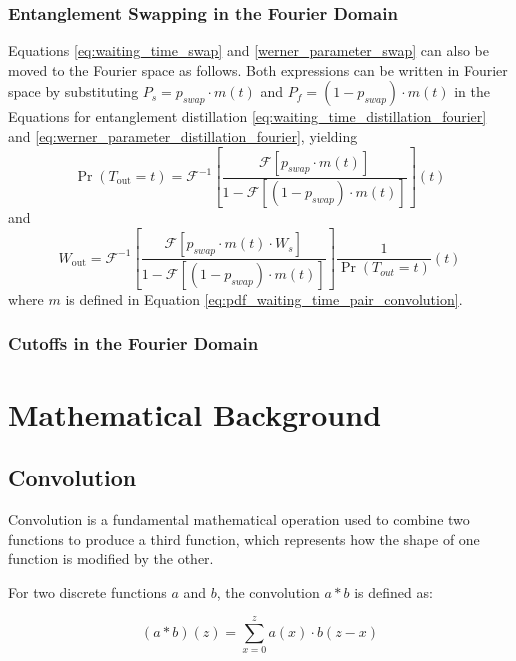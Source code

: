\documentclass{masterthesis}
\begin{document}
\subsection*{Entanglement Swapping in the Fourier Domain}

Equations \ref{eq:waiting_time_swap} and \ref{werner_parameter_swap} can also be moved to the Fourier space as follows.
Both expressions can be written in Fourier space by substituting $P_s = p_{swap} \cdot m(t)$ and $P_f = (1 - p_{swap}) \cdot m(t)$ in the Equations for entanglement distillation \ref{eq:waiting_time_distillation_fourier} and \ref{eq:werner_parameter_distillation_fourier}, yielding
\begin{equation}
    \Pr(T_{\text{out}} = t) = \mathcal{F}^{-1} \left[ \frac{\mathcal{F}[p_{swap} \cdot m(t)]}{1 - \mathcal{F}[(1 - p_{swap}) \cdot m(t)]} \right](t)
\end{equation}
and
\begin{equation}
    W_{\text{out}} = \mathcal{F}^{-1} \left[ \frac{\mathcal{F}[p_{swap} \cdot m(t) \cdot W_s]}{1 - \mathcal{F}[(1 - p_{swap}) \cdot m(t)]} \right] \frac{1}{\Pr(T_{out}=t)}(t)
\end{equation}
where $m$ is defined in Equation \ref{eq:pdf_waiting_time_pair_convolution}.

\subsection*{Cutoffs in the Fourier Domain}

\appendix

\chapter*{Mathematical Background} %

\section*{Convolution}

Convolution is a fundamental mathematical operation used to combine two functions to produce a third function, which represents how the shape of one function is modified by the other. 

For two discrete functions \(a\) and \(b\), the convolution \(a * b\) is defined as:

\begin{equation}
    (a * b)(z) = \sum_{x=0}^{z} a(x) \cdot b(z - x)
\end{equation}
\end{document}
